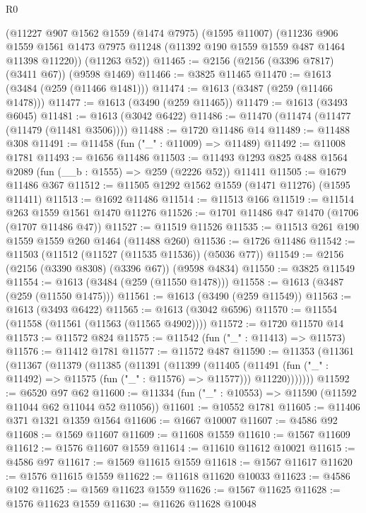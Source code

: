 \begin{lexlean}{R0}
\begin{coremodule}
    (@11227
      @907
      @1562
      @1559
      (@1474 @7975)
      (@1595 @11007)
      (@11236
        @906
        @1559
        @1561
        @1473
        @7975
        @11248
        (@11392 @190 @1559 @1559 @487 @1464 @11398 @11220))
      (@11263 @52))
@11465 := @2156 (@2156 (@3396 @7817) (@3411 @67)) (@9598 @1469)
@11466 := @3825 @11465
@11470 := @1613 (@3484 (@259 (@11466 @1481)))
@11474 := @1613 (@3487 (@259 (@11466 @1478)))
@11477 := @1613 (@3490 (@259 @11465))
@11479 := @1613 (@3493 @6045)
@11481 := @1613 (@3042 @6422)
@11486 := @11470 (@11474 (@11477 (@11479 (@11481 @3506))))
@11488 := @1720 @11486 @14
@11489 := @11488 @308
@11491 := @11458 (fun ("_" : @11009) => @11489)
@11492 := @11008 @1781
@11493 := @1656 @11486
@11503 := @11493 @1293 @825 @488 @1564 @2089 (fun (__b : @1555) => @259 (@2226 @52)) @11411
@11505 := @1679 @11486 @367
@11512 := @11505 @1292 @1562 @1559 (@1471 @11276) (@1595 @11411)
@11513 := @1692 @11486
@11514 := @11513 @166
@11519 := @11514 @263 @1559 @1561 @1470 @11276
@11526 := @1701 @11486 @47 @1470 (@1706 (@1707 @11486 @47))
@11527 := @11519 @11526
@11535 := @11513 @261 @190 @1559 @1559 @260 @1464 (@11488 @260)
@11536 := @1726 @11486
@11542 := @11503 (@11512 (@11527 (@11535 @11536)) (@5036 @77))
@11549 := @2156 (@2156 (@3390 @8308) (@3396 @67)) (@9598 @4834)
@11550 := @3825 @11549
@11554 := @1613 (@3484 (@259 (@11550 @1478)))
@11558 := @1613 (@3487 (@259 (@11550 @1475)))
@11561 := @1613 (@3490 (@259 @11549))
@11563 := @1613 (@3493 @6422)
@11565 := @1613 (@3042 @6596)
@11570 := @11554 (@11558 (@11561 (@11563 (@11565 @4902))))
@11572 := @1720 @11570 @14
@11573 := @11572 @824
@11575 := @11542 (fun ("_" : @11413) => @11573)
@11576 := @11412 @1781
@11577 := @11572 @487
@11590 := @11353
    (@11361
      (@11367
        (@11379
          (@11385
            (@11391
              (@11399
                (@11405
                  (@11491 (fun ("_" : @11492) => @11575 (fun ("_" : @11576) => @11577)))
                  @11220)))))))
@11592 := @6520 @97 @62
@11600 := @11334 (fun ("_" : @10553) => @11590 (@11592 @11044 @62 @11044 @52 @11056))
@11601 := @10552 @1781
@11605 := @11406 @371 @1321 @1359 @1564
@11606 := @1667 @10007
@11607 := @4586 @92
@11608 := @1569 @11607
@11609 := @11608 @1559
@11610 := @1567 @11609
@11612 := @1576 @11607 @1559
@11614 := @11610 @11612 @10021
@11615 := @4586 @97
@11617 := @1569 @11615 @1559
@11618 := @1567 @11617
@11620 := @1576 @11615 @1559
@11622 := @11618 @11620 @10033
@11623 := @4586 @102
@11625 := @1569 @11623 @1559
@11626 := @1567 @11625
@11628 := @1576 @11623 @1559
@11630 := @11626 @11628 @10048

\end{coremodule}
\end{lexlean}
